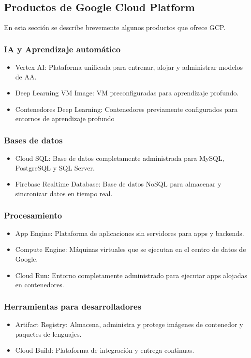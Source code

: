 \documentclass[../Main.tex]{subfiles}
\begin{document}
    \subsection{Productos de Google Cloud Platform}
    En esta sección se describe brevemente algunos productos que ofrece GCP.
    \subsubsection{IA y Aprendizaje automático}
        \begin{itemize}
            \item Vertex AI: Plataforma unificada para entrenar, alojar y administrar modelos de AA.
            \item Deep Learning VM Image: VM preconfiguradas para aprendizaje profundo.
            \item Contenedores Deep Learning: Contenedores previamente configurados para entornos de aprendizaje profundo
        \end{itemize}
    
    \subsubsection{Bases de datos}
    \begin{itemize}
        \item Cloud SQL: Base de datos completamente administrada para MySQL, PostgreSQL y SQL Server.
        \item Firebase Realtime Database: Base de datos NoSQL para almacenar y sincronizar datos en tiempo real.
    \end{itemize}
    
    \subsubsection{Procesamiento}
    \begin{itemize}
        \item App Engine: Plataforma de aplicaciones sin servidores para apps y backends.
        \item Compute Engine: Máquinas virtuales que se ejecutan en el centro de datos de Google.
        \item Cloud Run: Entorno completamente administrado para ejecutar apps alojadas en contenedores.
    \end{itemize}
    
    \subsubsection{Herramientas para desarrolladores}
    \begin{itemize}
        \item Artifact Registry: Almacena, administra y protege imágenes de contenedor y paquetes de lenguajes.
        \item Cloud Build: Plataforma de integración y entrega continuas.
    \end{itemize}
    
\end{document}
